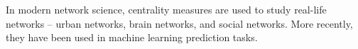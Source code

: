 \documentclass[preview]{standalone}
\begin{document}
In modern network science, centrality measures are used to study real-life networks -- urban networks, brain networks, and social networks. More recently, they have been used in machine learning prediction tasks.\\
\end{document}
